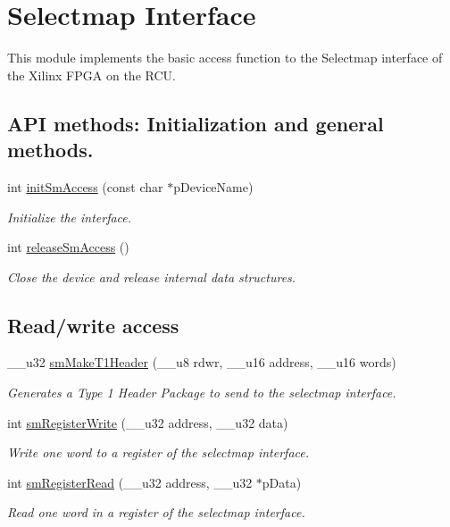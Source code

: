 \hypertarget{group__selectmap__access}{
\section{Selectmap Interface}
\label{group__selectmap__access}
}
This module implements the basic access function to the Selectmap interface of the Xilinx FPGA on the RCU.  
\subsection*{API methods: Initialization and general methods.}
\begin{CompactItemize}
\item 
int \hyperlink{group__selectmap__access_g3a82967a2ac2933832a98aa2d822fd7b}{init\-Sm\-Access} (const char $\ast$p\-Device\-Name)
\begin{CompactList}\small\item\em Initialize the interface. \item\end{CompactList}\item 
int \hyperlink{group__selectmap__access_g75466b7556397eb41108eb84212c5b19}{release\-Sm\-Access} ()
\begin{CompactList}\small\item\em Close the device and release internal data structures. \item\end{CompactList}\end{CompactItemize}
\subsection*{Read/write access}
\begin{CompactItemize}
\item 
\_\-\_\-u32 \hyperlink{group__selectmap__access_g88f0784ea00a5707d5fc4db2778e1b2a}{sm\-Make\-T1Header} (\_\-\_\-u8 rdwr, \_\-\_\-u16 address, \_\-\_\-u16 words)
\begin{CompactList}\small\item\em Generates a Type 1 Header Package to send to the selectmap interface. \item\end{CompactList}\item 
int \hyperlink{group__selectmap__access_ge0d7561e2ddca5878fe0c39c948dfdd2}{sm\-Register\-Write} (\_\-\_\-u32 address, \_\-\_\-u32 data)
\begin{CompactList}\small\item\em Write one word to a register of the selectmap interface. \item\end{CompactList}\item 
int \hyperlink{group__selectmap__access_gf7536588344d4c30f928de00a240baa8}{sm\-Register\-Read} (\_\-\_\-u32 address, \_\-\_\-u32 $\ast$p\-Data)
\begin{CompactList}\small\item\em Read one word in a register of the selectmap interface. \item\end{CompactList}\end{CompactItemize}


